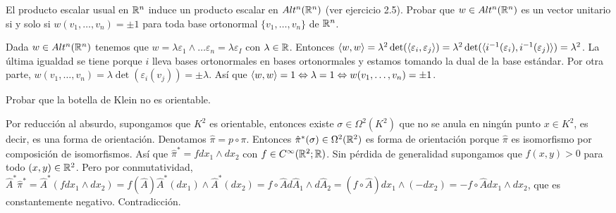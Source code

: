 \documentclass[twoside]{article}
\begin{document}
\newpage

\begin{ejercicio}{9.12}
El producto escalar usual en $\mathbb{R}^n$ induce un producto escalar en $Alt^n(\mathbb{R}^n)$ (ver ejercicio 2.5). Probar que $w\in Alt^n(\mathbb{R}^n)$ es un vector unitario si y solo si $w(v_1,\dots, v_n)=\pm 1$ para toda base ortonormal $\{v_1,\dots, v_n\}$ de $\mathbb{R}^n$.
\end{ejercicio}
\begin{solucion}
Dada $w\in Alt^n(\mathbb{R}^n)$ tenemos que $w=\lambda \varepsilon_1\land\dots\varepsilon_n=\lambda\varepsilon_I$ con $\lambda\in\mathbb{R}$. Entonces $\langle{w,w}\rangle=\lambda^2\det(\langle{\varepsilon_i,\varepsilon_j}\rangle)=\lambda^2\det(\langle{i^{-1}(\varepsilon_i),i^{-1}(\varepsilon_j)}\rangle)=\lambda^2$. La última igualdad se tiene porque $i$ lleva bases ortonormales en bases ortonormales y estamos tomando la dual de la base estándar. Por otra parte, $w(v_1,\dots, v_n)=\lambda\det(\varepsilon_i(v_j))=\pm\lambda$. Así que $\langle{w,w}\rangle=1\Leftrightarrow \lambda=1\Leftrightarrow w(v_1,\dots, v_n)=\pm 1$.
\end{solucion}

\newpage

\begin{ejercicio}{9.13}
Probar que la botella de Klein no es orientable.
\end{ejercicio}
\begin{solucion}
Por reducción al absurdo, supongamos que $K^2$ es orientable, entonces existe $\sigma\in\Omega^2(K^2)$ que no se anula en ningún punto $x\in K^2$, es decir, es una forma de orientación. Denotamos $\hat{\pi}=p\circ\pi$. Entonces $\hat{\pi}^*(\sigma)\in\Omega^2(\mathbb{R}^2)$ es forma de orientación porque $\hat{\pi}$ es isomorfismo por composición de isomorfismos. Así que $\hat{\pi}^*=f dx_1\land dx_2$ con $f\in C^{\infty}(\mathbb{R}^2;\mathbb{R})$. Sin pérdida de generalidad supongamos que $f(x,y)>0$ para todo $(x,y)\in\mathbb{R}^2$. Pero por conmutatividad, $\hat{A}^*\hat{\pi}^*=\hat{A}^*(fdx_1\land dx_2)=f(\hat{A})\hat{A}^*(dx_1)\land\hat{A}^*(dx_2)=f\circ\hat{A} d\hat{A}_1\land d\hat{A}_2=(f\circ\hat{A}) dx_1\land (-dx_2)=-f\circ\hat{A} dx_1\land dx_2$, que es constantemente negativo. Contradicción. 
\end{solucion}
\newpage
\end{document}
